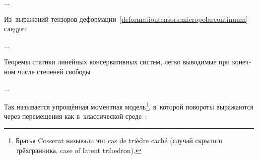 \begin{otherlanguage}{russian}
...



\label{para:compatibilityequations.cosseratcontinuum}

Из~выражений тензоров деформации~\eqref{deformationtensors:micropolarcontinuum} следует

...





Теоремы статики линейных консервативных систем, легко выводимые при конечном числе степеней свободы

...





\label{para:caseoflatenttrihedron.smalldisplacementsandrotations}

Так называется упрощённая моментная модель\footnote{Братья Cosserat называли это cas de trièdre caché (случай скрытого трёхгранника, case of latent trihedron).}\hspace{-0.32em},\hspace{0.24em} в~которой повороты выражаются через перемещения как в~классической среде~\cite{nowacki-elasticity}:


\end{otherlanguage}
